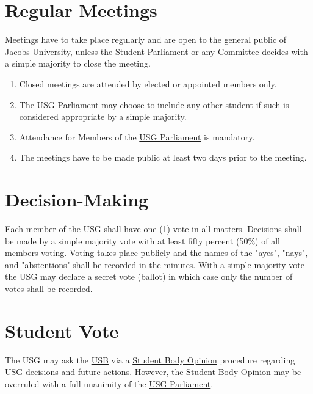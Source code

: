 \documentclass[12pt]{LaTeX_Misc/constitution}
\begin{document}
\section{Regular Meetings}
Meetings have to take place regularly and are open to the general public of Jacobs University, unless the Student Parliament or any Committee decides with a simple majority to close the meeting. 
\begin{enumerate}[label={\textbf{\S\arabic*}}]
\item Closed meetings are attended by elected or appointed members only. 
\item The USG Parliament may choose to include any other student if such is considered appropriate by a simple majority. 
\item Attendance for Members of the \hyperref[USGParliamentDef]{USG Parliament} is mandatory.
\item The meetings have to be made public at least two days prior to the meeting.
\end{enumerate}


\section{Decision-Making} 
Each member of the USG shall have one (1) vote in all matters. Decisions shall be made by a simple majority vote with at least fifty percent (50\%) of all members voting. Voting takes place publicly and the names of the "ayes", "nays", and "abstentions" shall be recorded in the minutes. With a simple majority vote the USG may declare a secret vote (ballot) in which case only the number of votes shall be recorded. 


\section{Student Vote}
The USG may ask the \hyperref[studentbody]{USB} via a \hyperref[StudentOpiniondef]{Student Body Opinion} procedure regarding USG decisions and future actions. However, the Student Body Opinion may be overruled with a full unanimity of the \hyperref[USGParliamentDef]{USG Parliament}.
\end{document}

